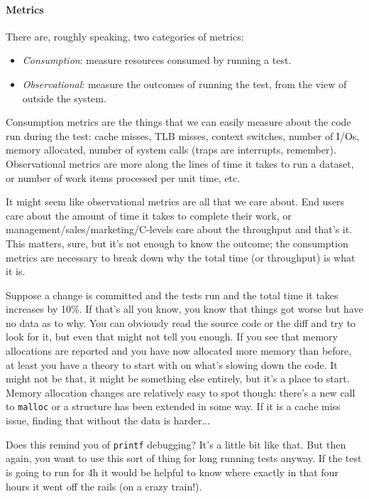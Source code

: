 \documentclass[a4paper]{report}
\begin{document}
\paragraph{Metrics} There are, roughly speaking, two categories of metrics:

\begin{itemize}
	\item \textit{Consumption}: measure resources consumed by running a test.
	\item \textit{Observational}: measure the outcomes of running the test, from the view of outside the system.
\end{itemize}

Consumption metrics are the things that we can easily measure about the code run during the test: cache misses, TLB misses, context switches, number of I/Os, memory allocated, number of system calls (traps are interrupts, remember). Observational metrics are more along the lines of time it takes to run a dataset, or number of work items processed per unit time, etc.

It might seem like observational metrics are all that we care about. End users care about the amount of time it takes to complete their work, or management/sales/marketing/C-levels care about the throughput and that's it. This matters, sure, but it's not enough to know the outcome; the consumption metrics are necessary to break down why the total time (or throughput) is what it is.

Suppose a change is committed and the tests run and the total time it takes increases by 10\%. If that's all you know, you know that things got worse but have no data as to why. You can obviously read the source code or the diff and try to look for it, but even that might not tell you enough. If you see that memory allocations are reported and you have now allocated more memory than before,  at least you have a theory to start with on what's slowing down the code. It might not be that, it might be something else entirely, but it's a place to start. Memory allocation changes are relatively easy to spot though: there's a new call to \texttt{malloc} or a structure has been extended in some way. If it is a cache miss issue, finding that without the data is harder...

Does this remind you of \texttt{printf} debugging? It's a little bit like that. But then again, you want to use this sort of thing for long running tests anyway. If the test is going to run for 4h it would be helpful to know where exactly in that four hours it went off the rails (on a crazy train!). 
\end{document}
